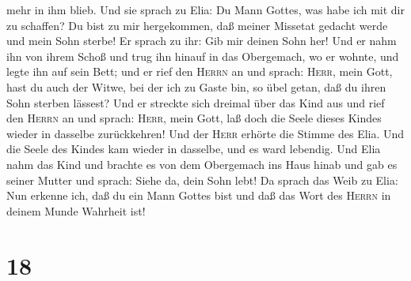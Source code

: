 mehr in ihm blieb.  Und sie sprach zu Elia: Du Mann
Gottes, was habe ich mit dir zu schaffen? Du bist zu mir hergekommen,
daß meiner Missetat gedacht werde und mein Sohn sterbe! 
Er sprach zu ihr: Gib mir deinen Sohn her! Und er nahm ihn von ihrem
Schoß und trug ihn hinauf in das Obergemach, wo er wohnte, und legte ihn
auf sein Bett;  und er rief den \textsc{Herrn} an und
sprach: \textsc{Herr}, mein Gott, hast du auch der Witwe, bei der ich zu
Gaste bin, so übel getan, daß du ihren Sohn sterben lässest?
 Und er streckte sich dreimal über das Kind aus und rief
den \textsc{Herrn} an und sprach: \textsc{Herr}, mein Gott, laß doch die
Seele dieses Kindes wieder in dasselbe zurückkehren!  Und
der \textsc{Herr} erhörte die Stimme des Elia. Und die Seele des Kindes
kam wieder in dasselbe, und es ward lebendig.  Und Elia
nahm das Kind und brachte es von dem Obergemach ins Haus hinab und gab
es seiner Mutter und sprach: Siehe da, dein Sohn lebt! 
Da sprach das Weib zu Elia: Nun erkenne ich, daß du ein Mann Gottes bist
und daß das Wort des \textsc{Herrn} in deinem Munde Wahrheit ist!

\hypertarget{section-17}{%
\section{18}\label{section-17}}

